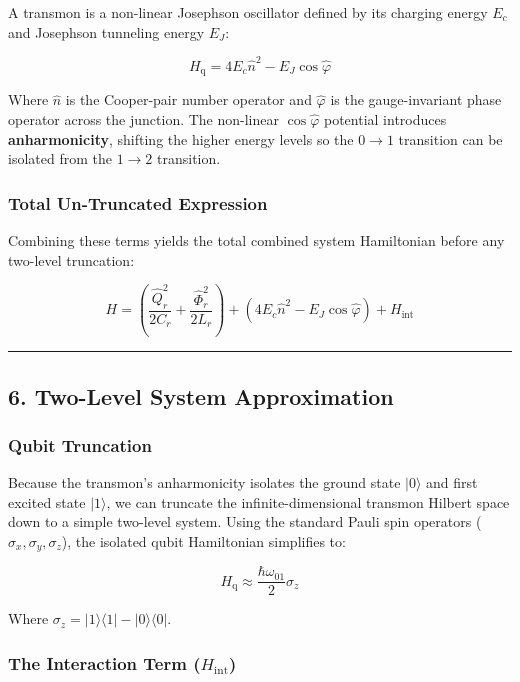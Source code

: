 \documentclass[
]{article}
\begin{document}
A transmon is a non-linear Josephson oscillator defined by its charging
energy \(E_c\) and Josephson tunneling energy \(E_J\):

\[H_{\text{q}} = 4E_c \hat{n}^2 - E_J \cos \hat{\varphi}\]

Where \(\hat{n}\) is the Cooper-pair number operator and
\(\hat{\varphi}\) is the gauge-invariant phase operator across the
junction. The non-linear \(\cos\hat{\varphi}\) potential introduces
\textbf{anharmonicity}, shifting the higher energy levels so the
\(0 \to 1\) transition can be isolated from the \(1 \to 2\) transition.

\subsubsection{Total Un-Truncated
Expression}\label{total-un-truncated-expression}

Combining these terms yields the total combined system Hamiltonian
before any two-level truncation:

\[H = \left( \frac{\hat{Q}_r^2}{2C_r} + \frac{\hat{\Phi}_r^2}{2L_r} \right) + \left( 4E_c \hat{n}^2 - E_J \cos \hat{\varphi} \right) + H_{\text{int}}\]

\begin{center}\rule{0.5\linewidth}{0.5pt}\end{center}

\subsection{6. Two-Level System
Approximation}\label{two-level-system-approximation}

\subsubsection{Qubit Truncation}\label{qubit-truncation}

Because the transmon's anharmonicity isolates the ground state
\(|0\rangle\) and first excited state \(|1\rangle\), we can truncate the
infinite-dimensional transmon Hilbert space down to a simple two-level
system. Using the standard Pauli spin operators
(\(\sigma_x, \sigma_y, \sigma_z\)), the isolated qubit Hamiltonian
simplifies to:

\[H_{\text{q}} \approx \frac{\hbar \omega_{01}}{2} \sigma_z\]

Where \(\sigma_z = |1\rangle\langle1| - |0\rangle\langle0|\).

\subsubsection{\texorpdfstring{The Interaction Term
(\(H_{\text{int}}\))}{The Interaction Term (H\_\{\textbackslash text\{int\}\})}}\label{the-interaction-term-h_textint}
\end{document}
